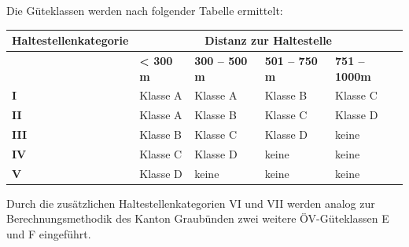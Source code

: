 \begin{itquote}
Die Güteklassen werden nach folgender Tabelle ermittelt:
\begin{table}[ht]
    \centering
    \begin{itquote}
    \begin{tabular}[c]{l p{2.2cm} p{2.2cm} p{2.2cm} p{2.2cm}}
        \toprule
        \textbf{Haltestellenkategorie}
                                & \multicolumn{4}{c}{\textbf{Distanz zur \gls{Haltestelle}}}\\
        \midrule
        \textbf{}
                                & \textbf{< 300 m}
                                & \textbf{300 -- 500 m}
                                & \textbf{501 -- 750 m}
                                & \textbf{751 -- 1000m}\\
        \textbf{I}
                                & Klasse A
                                & Klasse A
                                & Klasse B
                                & Klasse C\\
        \textbf{II}
                                & Klasse A
                                & Klasse B
                                & Klasse C
                                & Klasse D\\
        \textbf{III}
                                & Klasse B
                                & Klasse C
                                & Klasse D
                                & keine\\
        \textbf{IV}
                                & Klasse C
                                & Klasse D
                                & keine
                                & keine\\
        \textbf{V}
                                & Klasse D
                                & keine
                                & keine
                                & keine\\
        \bottomrule
    \end{tabular}
    \end{itquote}
\end{table}
\end{itquote}

Durch die zusätzlichen Haltestellenkategorien VI und VII werden analog zur Berechnungsmethodik des Kanton Graubünden zwei weitere ÖV-Güteklassen E und F eingeführt.

